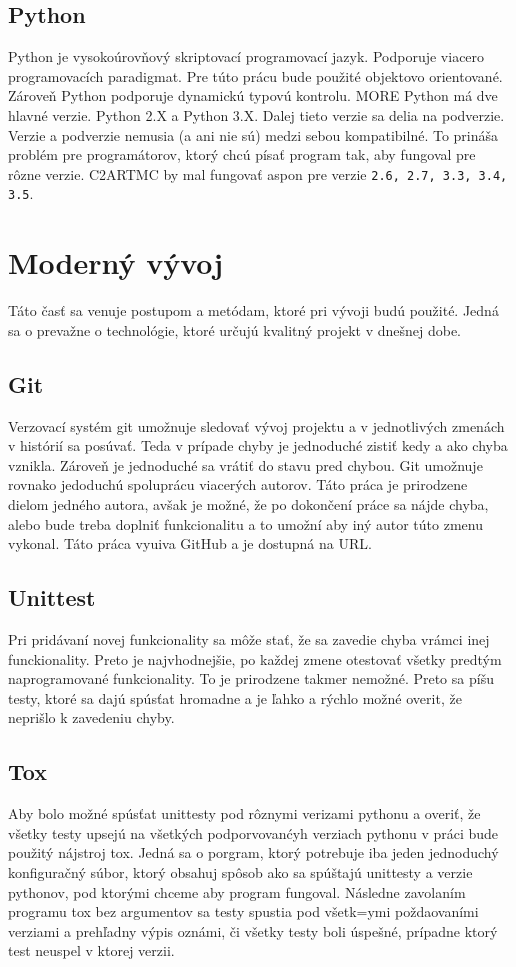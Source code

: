 \subsection{Python}
Python je vysokoúrovňový skriptovací programovací jazyk. Podporuje viacero programovacích
paradigmat. Pre túto prácu bude použité objektovo orientované. Zároveň Python podporuje
dynamickú typovú kontrolu. MORE
Python má dve hlavné verzie. Python 2.X a Python 3.X. Dalej tieto verzie sa delia na podverzie.
Verzie a podverzie nemusia (a ani nie sú) medzi sebou kompatibilné. To prináša problém
pre programátorov, ktorý chcú písať program tak, aby fungoval pre rôzne verzie.
C2ARTMC by mal fungovať aspon pre verzie \texttt{2.6, 2.7, 3.3, 3.4, 3.5}.

\section{Moderný vývoj}
Táto časť sa venuje postupom a metódam, ktoré pri vývoji budú použité. Jedná sa
o prevažne o technológie, ktoré určujú kvalitný projekt v dnešnej dobe.

\subsection{Git}
Verzovací systém git umožnuje sledovať vývoj projektu a v jednotlivých zmenách
v histórií sa posúvať. Teda v prípade chyby je jednoduché zistiť kedy a ako chyba
vznikla. Zároveň je jednoduché sa vrátiť do stavu pred chybou.
Git umožnuje rovnako jedoduchú spoluprácu viacerých autorov. Táto práca je
prirodzene dielom jedného autora, avšak je možné, že po dokončení práce sa nájde
chyba, alebo bude treba doplniť funkcionalitu a to umožní aby iný autor túto zmenu
vykonal.
Táto práca vyuiva GitHub a je dostupná na URL.

\subsection{Unittest}
Pri pridávaní novej funkcionality sa môže stať, že sa zavedie chyba vrámci inej
funckionality. Preto je najvhodnejšie, po každej zmene otestovať všetky predtým
naprogramované funkcionality. To je prirodzene takmer nemožné. Preto sa píšu testy,
ktoré sa dajú spúsťat hromadne a je ľahko a rýchlo možné overit, že neprišlo k
zavedeniu chyby.

\subsection{Tox}
Aby bolo možné spúsťat unittesty pod rôznymi verizami pythonu a overiť, že všetky testy
upsejú na všetkých podporvovanćyh verziach pythonu v práci bude použitý nájstroj tox.
Jedná sa o porgram, ktorý potrebuje iba jeden jednoduchý konfiguračný súbor, ktorý
obsahuj spôsob ako sa spúštajú unittesty a verzie pythonov, pod ktorými chceme
aby program fungoval. Následne zavolaním programu tox bez argumentov sa testy
spustia pod všetk=ymi poždaovaními verziami a prehľadny výpis oznámi, či všetky
testy boli úspešné, prípadne ktorý test neuspel v ktorej verzii.

